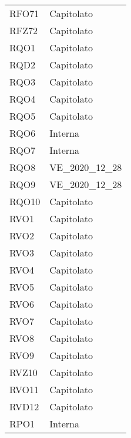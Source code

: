 \begin{longtable}{|C{6cm} C{3cm}|}
    RFO71 & Capitolato \\
    
    RFZ72 & Capitolato \\
    
	RQO1 & Capitolato \\
	
	RQD2 & Capitolato \\
	
	RQO3 & Capitolato \\
	
	RQO4 & Capitolato \\

	RQO5 & Capitolato \\

	RQO6 & Interna \\

	RQO7 & Interna  \\
	
	RQO8 & VE\_2020\_12\_28 \\
	
	RQO9 & VE\_2020\_12\_28 \\
	
	RQO10 & Capitolato \\
	
	RVO1 & Capitolato \\
	
	RVO2 & Capitolato \\
	
	RVO3 & Capitolato \\
	
	RVO4 & Capitolato \\
	
	RVO5 & Capitolato \\
	
	RVO6 & Capitolato \\
	
	RVO7 & Capitolato \\
	
	RVO8 & Capitolato \\
	
	RVO9 & Capitolato \\
	
	RVZ10 & Capitolato \\
	
	RVO11 & Capitolato \\
	
	RVD12 & Capitolato \\
	
    RPO1 & Interna \\
\end{longtable}
